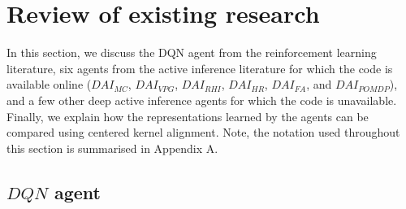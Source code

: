 \documentclass[twoside,11pt]{article}
\begin{document}
\section{Review of existing research} \label{sec:existing_research}

In this section, we discuss the DQN agent from the reinforcement learning literature, six agents from the active inference literature for which the code is available online ($DAI_{MC}$, $DAI_{VPG}$, $DAI_{RHI}$, $DAI_{HR}$, $DAI_{FA}$, and $DAI_{POMDP}$), and a few other deep active inference agents for which the code is unavailable. Finally, we explain how the representations learned by the agents can be compared using centered kernel alignment. Note, the notation used throughout this section is summarised in Appendix A.

\subsection{$DQN$ agent \citep{DeepRL}} \label{ssec:dqn}
\end{document}
